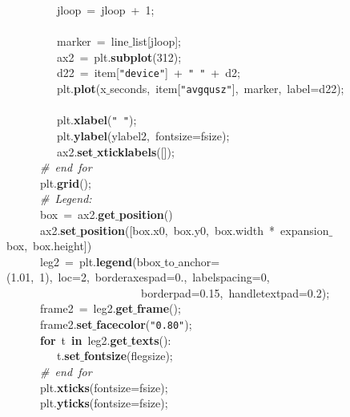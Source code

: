 \mbox{}\ \ \ \ \ \ \ \ \ jloop\ =\ jloop\ +\ 1; \\
\mbox{}\ \ \ \ \ \ \ \ \  \\
\mbox{}\ \ \ \ \ \ \ \ \ marker\ =\ line$\_$list[jloop]; \\
\mbox{}\ \ \ \ \ \ \ \ \ ax2\ =\ plt.\textbf{subplot}(312); \\
\mbox{}\ \ \ \ \ \ \ \ \ d22\ =\ item[\texttt{"{}device"{}}]\ +\ \texttt{"{}\ "{}}\ +\ d2; \\
\mbox{}\ \ \ \ \ \ \ \ \ plt.\textbf{plot}(x$\_$seconds,\ item[\texttt{"{}avgqusz"{}}],\ marker,\ label=d22); \\
\mbox{}\ \ \ \ \ \ \ \ \  \\
\mbox{}\ \ \ \ \ \ \ \ \ plt.\textbf{xlabel}(\texttt{"{}\ "{}}); \\
\mbox{}\ \ \ \ \ \ \ \ \ plt.\textbf{ylabel}(ylabel2,\ fontsize=fsize); \\
\mbox{}\ \ \ \ \ \ \ \ \ ax2.\textbf{set$\_$xticklabels}([]); \\
\mbox{}\ \ \ \ \ \ \textit{\#\ end\ for} \\
\mbox{}\ \ \ \ \ \ plt.\textbf{grid}(); \\
\mbox{}\ \ \ \ \ \ \textit{\#\ Legend:} \\
\mbox{}\ \ \ \ \ \ box\ =\ ax2.\textbf{get$\_$position}() \\
\mbox{}\ \ \ \ \ \ ax2.\textbf{set$\_$position}([box.x0,\ box.y0,\ box.width\ *\ expansion$\_$box,\ box.height]) \\
\mbox{}\ \ \ \ \ \ leg2\ =\ plt.\textbf{legend}(bbox$\_$to$\_$anchor=(1.01,\ 1),\ loc=2,\ borderaxespad=0.,\ labelspacing=0,\  \\
\mbox{}\ \ \ \ \ \ \ \ \ \ \ \ \ \ \ \ \ \ \ \ \ \ \ \ borderpad=0.15,\ handletextpad=0.2); \\
\mbox{}\ \ \ \ \ \ frame2\ =\ leg2.\textbf{get$\_$frame}(); \\
\mbox{}\ \ \ \ \ \ frame2.\textbf{set$\_$facecolor}(\texttt{"{}0.80"{}}); \\
\mbox{}\ \ \ \ \ \ \textbf{for}\ t\ \textbf{in}\ leg2.\textbf{get$\_$texts}(): \\
\mbox{}\ \ \ \ \ \ \ \ \ t.\textbf{set$\_$fontsize}(flegsize); \\
\mbox{}\ \ \ \ \ \ \textit{\#\ end\ for} \\
\mbox{}\ \ \ \ \ \ plt.\textbf{xticks}(fontsize=fsize); \\
\mbox{}\ \ \ \ \ \ plt.\textbf{yticks}(fontsize=fsize); \\
\mbox{}\ \ \ \ \ \  \\

